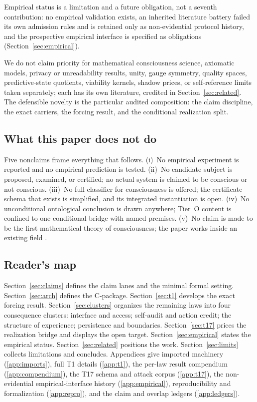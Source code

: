 \documentclass[11pt]{article}
\theoremstyle{definition}
\begin{document}
Empirical status is a limitation and a future obligation, not a seventh
contribution: no empirical validation exists, an inherited literature battery
failed its own admission rules and is retained only as non-evidential protocol
history, and the prospective empirical interface is specified as obligations
(Section~\ref{sec:empirical}).

We do not claim priority for mathematical consciousness science, axiomatic
models, privacy or unreadability results, unity, gauge symmetry, quality
spaces, predictive-state quotients, viability kernels, shadow prices, or
self-reference limits taken separately; each has its own literature, credited
in Section~\ref{sec:related}. The defensible novelty is the particular audited
composition: the claim discipline, the exact carriers, the forcing result, and
the conditional realization split.

\subsection{What this paper does not do}

Five nonclaims frame everything that follows. (i)~No empirical experiment is
reported and no empirical prediction is tested. (ii)~No candidate subject is
proposed, examined, or certified; no actual system is claimed to be conscious
or not conscious. (iii)~No full classifier for consciousness is offered; the
certificate schema that exists is simplified, and its integrated instantiation
is open. (iv)~No unconditional ontological conclusion is drawn anywhere; Tier~O
content is confined to one conditional bridge with named premises.
(v)~No claim is made to be the first mathematical theory of consciousness; the
paper works inside an existing field
\citep{Kleiner2020MathematicalModels, SignorelliWangCoecke2021,
ChangEtAl2020InformationClosure, KleinerTull2021}.

\subsection{Reader's map}

Section~\ref{sec:claims} defines the claim lanes and the minimal formal
setting. Section~\ref{sec:arch} defines the C-package.
Section~\ref{sec:t1} develops the exact forcing result.
Section~\ref{sec:clusters} organizes the remaining laws into four consequence
clusters: interface and access; self-audit and action credit; the structure of
experience; persistence and boundaries. Section~\ref{sec:t17} prices the
realization bridge and displays the open target. Section~\ref{sec:empirical}
states the empirical status. Section~\ref{sec:related} positions the work.
Section~\ref{sec:limits} collects limitations and concludes. Appendices give
imported machinery (\ref{app:imports}), full T1 details (\ref{app:t1}), the
per-law result compendium (\ref{app:compendium}), the T17 schema and attack
corpus (\ref{app:t17}), the non-evidential empirical-interface history
(\ref{app:empirical}), reproducibility and formalization (\ref{app:repro}),
and the claim and overlap ledgers (\ref{app:ledgers}).
\end{document}
